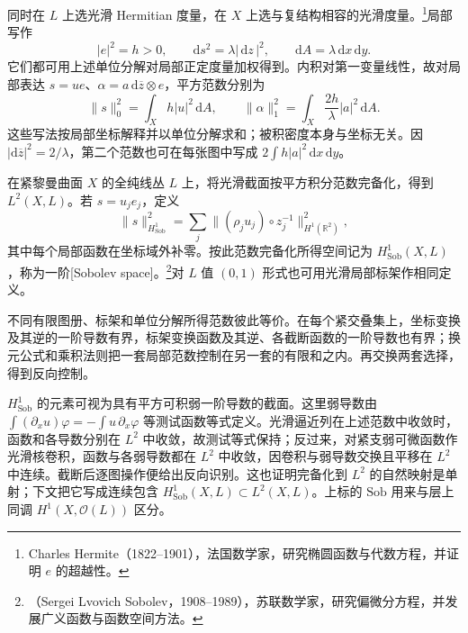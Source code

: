 \ProseParagraphBreak

同时在 \(L\) 上选光滑 Hermitian 度量，在 \(X\) 上选与复结构相容的光滑度量。\footnote{Charles Hermite（1822--1901），法国数学家，研究椭圆函数与代数方程，并证明 \(e\) 的超越性。}局部写作
\[
	|e|^2=h>0,\qquad \mathrm{d}s^2=\lambda|\,\mathrm{d}z\,|^2,\qquad
	\mathrm{d}A=\lambda\,\mathrm{d}x\,\mathrm{d}y.
\]
它们都可用上述单位分解对局部正定度量加权得到。内积对第一变量线性，故对局部表达 \(s=u e\)、\(\alpha=a\,\mathrm{d}\overline z\otimes e\)，平方范数分别为
\begin{equation}
	\label{g4:eq:0303:l2-metrics}
	\|s\|_0^2=\int_X h|u|^2\,\mathrm{d}A,\qquad
	\|\alpha\|_1^2=\int_X \frac{2h}{\lambda}|a|^2\,\mathrm{d}A.
\end{equation}
这些写法按局部坐标解释并以单位分解求和；被积密度本身与坐标无关。因 \(|\mathrm{d}\overline z|^2=2/\lambda\)，第二个范数也可在每张图中写成 \(2\int h|a|^2\,\mathrm{d}x\,\mathrm{d}y\)。

\begin{definition}
	\label{g4:def:0303:sobolev}
	在紧黎曼曲面 \(X\) 的全纯线丛 \(L\) 上，将光滑截面按平方积分范数完备化，得到 \(L^2(X,L)\)。若 \(s=u_j e_j\)，定义
	\[
		\|s\|_{H^1_{\mathrm{Sob}}}^2
		=\sum_j\|(\rho_j u_j)\circ z_j^{-1}\|_{H^1(\mathbb R^2)}^2,
	\]
	其中每个局部函数在坐标域外补零。按此范数完备化所得空间记为 \(H^1_{\mathrm{Sob}}(X,L)\)，称为一阶[Sobolev space]。\footnote{（Sergei Lvovich Sobolev，1908--1989），苏联数学家，研究偏微分方程，并发展广义函数与函数空间方法。}对 \(L\) 值 \((0,1)\) 形式也可用光滑局部标架作相同定义。
\end{definition}

不同有限图册、标架和单位分解所得范数彼此等价。在每个紧交叠集上，坐标变换及其逆的一阶导数有界，标架变换函数及其逆、各截断函数的一阶导数也有界；换元公式和乘积法则把一套局部范数控制在另一套的有限和之内。再交换两套选择，得到反向控制。

\ProseParagraphBreak

\(H^1_{\mathrm{Sob}}\) 的元素可视为具有平方可积弱一阶导数的截面。这里弱导数由 \(\int(\partial_xu)\varphi=-\int u\,\partial_x\varphi\) 等测试函数等式定义。光滑逼近列在上述范数中收敛时，函数和各导数分别在 \(L^2\) 中收敛，故测试等式保持；反过来，对紧支弱可微函数作光滑核卷积，函数与各弱导数都在 \(L^2\) 中收敛，因卷积与弱导数交换且平移在 \(L^2\) 中连续。截断后逐图操作便给出反向识别。这也证明完备化到 \(L^2\) 的自然映射是单射；下文把它写成连续包含 \(H^1_{\mathrm{Sob}}(X,L)\subset L^2(X,L)\)。上标的 \(\mathrm{Sob}\) 用来与层上同调 \(H^1(X,\mathcal O(L))\) 区分。

